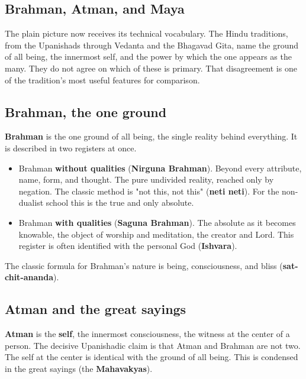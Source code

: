 \subsection{Brahman, Atman, and Maya}

The plain picture now receives its technical vocabulary. The Hindu traditions, from the Upanishads through Vedanta and the Bhagavad Gita, name the ground of all being, the innermost self, and the power by which the one appears as the many. They do not agree on which of these is primary. That disagreement is one of the tradition's most useful features for comparison.

\subsection{Brahman, the one ground}

\textbf{Brahman} is the one ground of all being, the single reality behind everything. It is described in two registers at once.

\begin{itemize}
 \item Brahman \textbf{without qualities} (\textbf{Nirguna Brahman}). Beyond every attribute, name, form, and thought. The pure undivided reality, reached only by negation. The classic method is "not this, not this" (\textbf{neti neti}). For the non-dualist school this is the true and only absolute.
 \item Brahman \textbf{with qualities} (\textbf{Saguna Brahman}). The absolute as it becomes knowable, the object of worship and meditation, the creator and Lord. This register is often identified with the personal God (\textbf{Ishvara}).
\end{itemize}

The classic formula for Brahman's nature is being, consciousness, and bliss (\textbf{sat-chit-ananda}).

\subsection{Atman and the great sayings}

\textbf{Atman} is the \textbf{self}, the innermost consciousness, the witness at the center of a person. The decisive Upanishadic claim is that Atman and Brahman are not two. The self at the center is identical with the ground of all being. This is condensed in the great sayings (the \textbf{Mahavakyas}).

